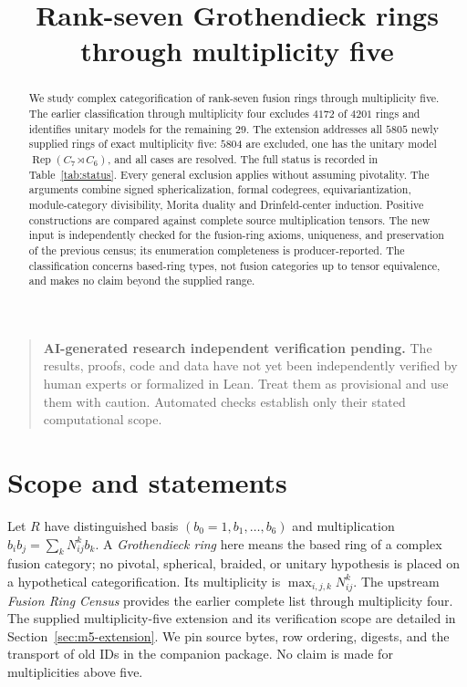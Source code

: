 \documentclass[11pt]{article}
\title{Rank-seven Grothendieck rings through multiplicity five}
\author{}
\date{}
\begin{document}
\maketitle
\begin{quote}\small
\textbf{AI-generated research \textperiodcentered{} independent verification pending.}
The results, proofs, code and data have not yet been independently
verified by human experts or formalized in Lean. Treat them as provisional
and use them with caution. Automated checks establish only their stated
computational scope.
\end{quote}
\begin{abstract}
We study complex categorification of rank-seven fusion rings through
multiplicity five. The earlier classification through multiplicity four
excludes $4172$ of $4201$ rings and identifies unitary models for the
remaining $29$. The extension addresses all $5805$ newly supplied rings
of exact multiplicity five: $5804$ are excluded, one has the unitary
model $\operatorname{Rep}(C_7\rtimes C_6)$, and all cases are resolved.
The full status is recorded in Table~\ref{tab:status}.
Every general exclusion applies without assuming pivotality.
The arguments combine signed sphericalization, formal codegrees,
equivariantization, module-category divisibility, Morita duality and
Drinfeld-center induction. Positive constructions are compared against
complete source multiplication tensors. The new input is independently
checked for the fusion-ring axioms, uniqueness, and preservation of the
previous census; its enumeration completeness is producer-reported.
The classification concerns based-ring types, not fusion categories up
to tensor equivalence, and makes no claim beyond the supplied range.
\end{abstract}

\section{Scope and statements}
Let $R$ have distinguished basis $(b_0=1,b_1,\ldots,b_6)$ and multiplication
$b_i b_j=\sum_k N_{ij}^k b_k$. A \emph{Grothendieck ring} here means the
based ring of a complex fusion category; no pivotal, spherical, braided,
or unitary hypothesis is placed on a hypothetical categorification.
Its multiplicity is $\max_{i,j,k}N_{ij}^k$. The upstream
\emph{Fusion Ring Census} \cite{Census} provides the earlier complete
list through multiplicity four. The supplied multiplicity-five extension
and its verification scope are detailed in Section~\ref{sec:m5-extension}.
We pin source bytes, row ordering, digests, and the transport of old IDs
in the companion package. No claim is made for multiplicities above five.
\end{document}
